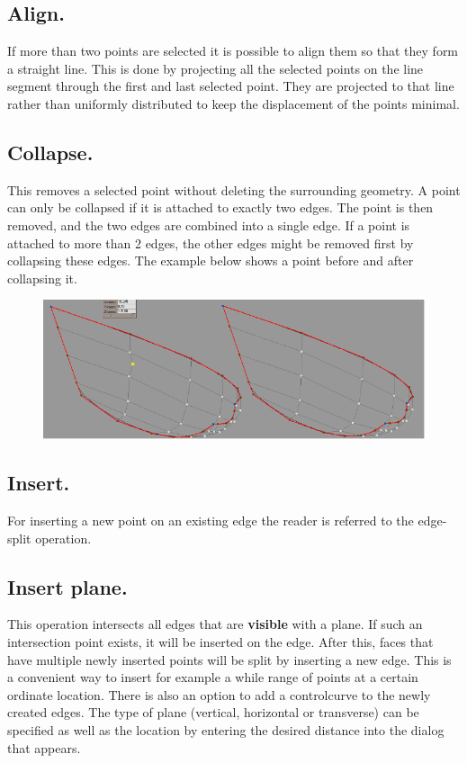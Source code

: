 \documentclass[12pt]{article}
\begin{document}
\subsection{Align.}
If more than two points are selected it is possible to align them so
that they form a straight line. This is done by projecting all the
selected points on the line segment through the first and last
selected point. They are projected to that line rather than uniformly
distributed to keep the displacement of the points minimal.

\subsection{Collapse.} \label{point-collapse}
This removes a selected point without deleting the surrounding
geometry. A point can only be collapsed if it is attached to exactly
two edges. The point is then removed, and the two edges are combined
into a single edge. If a point is attached to more than 2 edges, the
other edges might be removed first by collapsing these edges. The
example below shows a point before and after collapsing it.

\begin{figure}[h]
        \centering
        \includegraphics[width=12cm,natwidth=723,natheight=264]{pointcollapse.png}
        \caption{}
        \label{fig:pointcollapse}
\end{figure}

\subsection{Insert.}
For inserting a new point on an existing edge the reader is referred
to the edge-split operation.

\subsection{Insert plane.}
This operation intersects all edges that are \textbf{visible} with a
plane. If such an intersection point exists, it will be inserted on
the edge. After this, faces that have multiple newly inserted points
will be split by inserting a new edge. This is a convenient way to
insert for example a while range of points at a certain ordinate
location. There is also an option to add a controlcurve to the newly
created edges.  The type of plane (vertical, horizontal or transverse)
can be specified as well as the location by entering the desired
distance into the dialog that appears.
\end{document}
